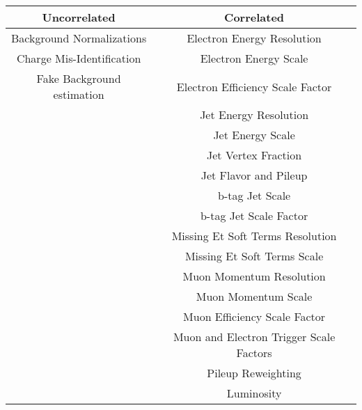 \small
\begin{tabular}{c||c}
\hline
Uncorrelated & Correlated \\
\hline\hline
Background Normalizations&Electron Energy Resolution\\
Charge Mis-Identification&Electron Energy Scale \\
Fake Background estimation&Electron Efficiency Scale Factor\\
 &Jet Energy Resolution\\
 &Jet Energy Scale \\
 &Jet Vertex Fraction\\
 &Jet Flavor and Pileup\\
 &b-tag Jet Scale\\
 &b-tag Jet Scale Factor\\
 &Missing Et Soft Terms Resolution\\
 &Missing Et Soft Terms Scale\\
 &Muon Momentum Resolution \\
 &Muon Momentum Scale\\
 &Muon Efficiency Scale Factor\\
 &Muon and Electron Trigger Scale Factors\\
 &Pileup Reweighting \\
 &Luminosity \\
\hline
\end{tabular}
